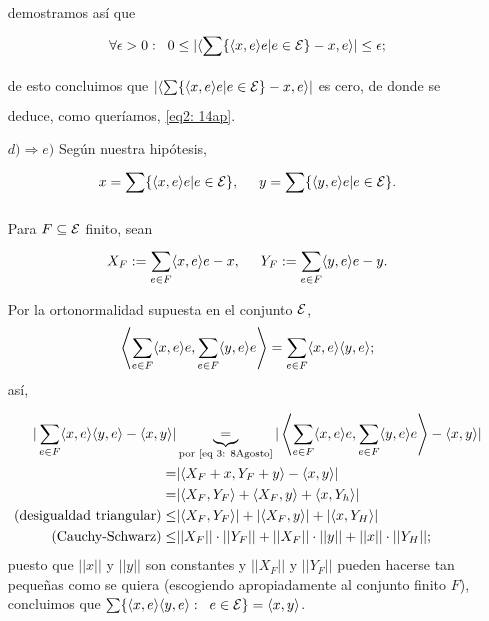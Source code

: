 \begin{itemize}
\noindent
demostramos así que
\[
\forall \epsilon > 0: \hspace{0.2cm} 
0 \leq  | \langle \sum\limits_{}^{}\{ \langle x,e \rangle e | e \in \mathcal{E} \} -x, e \rangle | \leq  \epsilon;
\]
de esto concluimos que $ | \langle \sum\limits_{}^{}\{ \langle x,e \rangle e | e \in \mathcal{E} \} -x, e \rangle |$ es cero, de donde se deduce, como queríamos, \eqref{eq2: 14ap}.


\item[$d) \Rightarrow e)$] Según nuestra hipótesis,
\[
x= \sum\limits_{}^{}\{ \langle x,e \rangle e | e \in \mathcal{E} \}, \hspace{0.5cm}
y= \sum\limits_{}^{}\{ \langle y,e \rangle e | e \in \mathcal{E} \}.
\]

\noindent
Para $F \subseteq \mathcal{E}$ finito, sean
\[
X_{F}:= \sum\limits_{e \in F}^{}\langle x, e \rangle e -x,
\hspace{0.5cm}
Y_{F}:= \sum\limits_{e \in F}^{}\langle y, e \rangle e -y.
\]

Por la ortonormalidad supuesta en el conjunto $\mathcal{E}$,
\begin{equation}
\label{eq 3: 8Agosto}
\left\langle \sum\limits_{e \in F}^{}\langle x, e \rangle e, 
\sum\limits_{e \in F}^{}\langle y, e\rangle e \right\rangle
= \sum\limits_{e \in F}^{}
\langle  x,e \rangle \langle y,e \rangle;
\end{equation}
así,



\begin{align*}
|\sum\limits_{e \in F}^{}\langle x,e \rangle \langle y,e \rangle - 
\langle  x,y \rangle | & \underbrace{=}_{\text{por 
\eqref{eq 3: 8Agosto}}} |\left\langle \sum\limits_{e \in F}^{}\langle x, e\rangle e, \sum\limits_{e \in F}^{}\langle y, e\rangle e \right\rangle
- \langle x,y\rangle | \\
= & |\langle X_{F}+x, Y_{F}+y \rangle  - \langle x,y\rangle | \\
= & |\langle X_{F}, Y_{F}\rangle + \langle X_{F}, y\rangle  + 
\langle x,Y_{h}\rangle | \\
(\text{desigualdad triangular}) \leq & |\langle X_{F}, Y_{F}\rangle  | + 
|\langle X_{F}, y \rangle |
+ |\langle x,Y_{H}\rangle | \\
(\text{Cauchy-Schwarz}) \leq & ||X_{F}|| \cdot ||Y_{F}|| +
||X_{F}|| \cdot ||y|| + ||x|| \cdot ||Y_{H}||;
\end{align*}
puesto que $||x||$ y $||y||$ son constantes
y $||X_{F}||$ y $||Y_{F}||$ pueden hacerse tan pequeñas como
se quiera (escogiendo apropiadamente al conjunto finito $F$),
concluimos que
$\sum\limits_{}^{} \{ \langle x,e \rangle \langle y, e \rangle: \hspace{0.2cm} e \in \mathcal{E} \}
= \langle x, y \rangle$.


\end{itemize}
